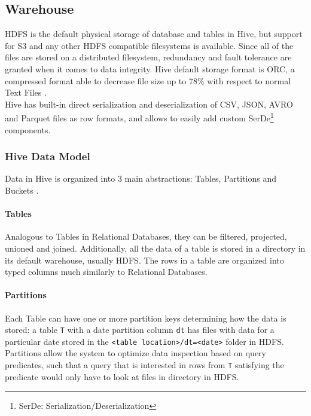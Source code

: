 \subsection{Warehouse}
HDFS is the default physical storage of database and tables in Hive, but support for S3 and any other HDFS compatible filesystems is available. Since all of the files are stored on a distributed filesystem, redundancy and fault tolerance are granted when it comes to data integrity. Hive default storage format is ORC, a compressed format able to decrease file size up to 78\% with respect to normal Text Files \cite{orc_format}.\\
Hive has built-in direct serialization and deserialization of CSV, JSON, AVRO and Parquet files as row formats, and allows to easily add custom SerDe\footnote{SerDe: Serialization/Deserialization} components.

\subsubsection{Hive Data Model}

Data in Hive is organized into 3 main abstractions: Tables, Partitions and Buckets \cite{hive_design}.

\paragraph{Tables} Analogous to Tables in Relational Databases, they can be filtered, projected, unioned and joined. Additionally, all the data of a table is stored in a directory in its default warehouse, usually HDFS. The rows in a table are organized into typed columns much similarly to Relational Databases.
\paragraph{Partitions} Each Table can have one or more partition keys determining how the data is stored: a table \texttt{T} with a date partition column \texttt{dt} has files with data for a particular date stored in the \texttt{<table location>/dt=<date>} folder in HDFS. Partitions allow the system to optimize data inspection based on query predicates, such that a query that is interested in rows from \texttt{T} satisfying the predicate \texttt{} would only have to look at files in \texttt{} directory in HDFS.
